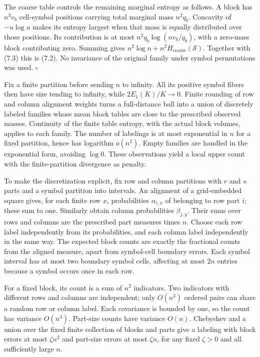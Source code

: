 \documentclass[english,11pt,a4paper]{article}
\begin{document}
The coarse table controls the remaining marginal entropy as follows. A block has \(n^3v_b\) cell-symbol positions carrying total marginal mass \(n^2q_b\). Concavity of \(-u\log u\) makes its entropy largest when that mass is equally distributed over those positions. Its contribution is at most \(n^2q_b\log(nv_b/q_b)\), with a zero-mass block contributing zero. Summing gives \(n^2\log n+n^2H_{\mathrm{coarse}}(\mathcal S)\). Together with (7.3) this is (7.2). No invariance of the original family under symbol permutations was used. \(\square\)

Fix a finite partition before sending \(n\) to infinity. All its positive symbol fibers then have size tending to infinity, while \(2E_1(K)/K\to0\). Finite rounding of row and column alignment weights turns a full-distance ball into a union of discretely labeled families whose mean block tables are close to the prescribed observed masses. Continuity of the finite table entropy, with the actual block volumes, applies to each family. The number of labelings is at most exponential in \(n\) for a fixed partition, hence has logarithm \(o(n^2)\). Empty families are handled in the exponential form, avoiding \(\log0\). These observations yield a local upper count with the finite-partition divergence as penalty.

To make the discretization explicit, fix row and column partitions with \(r\) and \(s\) parts and a symbol partition into intervals. An alignment of a grid-embedded square gives, for each finite row \(x\), probabilities \(\alpha_{i,x}\) of belonging to row part \(i\); these sum to one. Similarly obtain column probabilities \(\beta_{j,y}\). Their sums over rows and columns are the prescribed part measures times \(n\). Choose each row label independently from its probabilities, and each column label independently in the same way. The expected block counts are exactly the fractional counts from the aligned measure, apart from symbol-cell boundary errors. Each symbol interval has at most two boundary symbol cells, affecting at most \(2n\) entries because a symbol occurs once in each row.

For a fixed block, its count is a sum of \(n^2\) indicators. Two indicators with different rows and columns are independent; only \(O(n^3)\) ordered pairs can share a random row or column label. Each covariance is bounded by one, so the count has variance \(O(n^3)\). Part-size counts have variance \(O(n)\). Chebyshev and a union over the fixed finite collection of blocks and parts give a labeling with block errors at most \(\zeta n^2\) and part-size errors at most \(\zeta n\), for any fixed \(\zeta>0\) and all sufficiently large \(n\).
\end{document}
